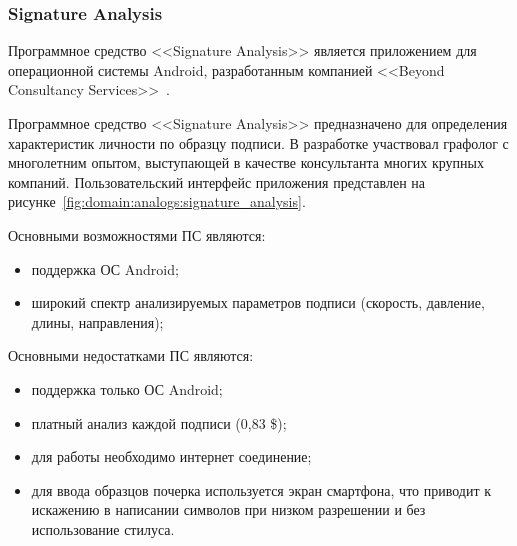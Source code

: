 \subsubsection{Signature Analysis}
\label{sub:domain:analogs:signature_analysis} 

Программное средство <<Signature Analysis>> является приложением для операционной системы Android, разработанным компанией <<Beyond Consultancy Services>>~\cite{analogs_signature_analysis}.

Программное средство <<Signature Analysis>> предназначено для определения характеристик личности по образцу подписи. В разработке участвовал графолог с многолетним опытом, выступающей в качестве консультанта многих крупных компаний.  Пользовательский интерфейс приложения представлен на рисунке~\ref{fig:domain:analogs:signature_analysis}.

Основными возможностями ПС являются:
\begin{itemize}
  \item поддержка ОС Android;
  \item широкий спектр анализируемых параметров подписи (скорость, давление, длины, направления);
\end{itemize}

Основными недостатками ПС являются:
\begin{itemize}
  \item поддержка только ОС Android;
  \item платный анализ каждой подписи (0,83 \$);
  \item для работы необходимо интернет соединение;
  \item для ввода образцов почерка используется экран смартфона, что приводит к искажению в написании символов при низком разрешении и без использование стилуса.
\end{itemize}

